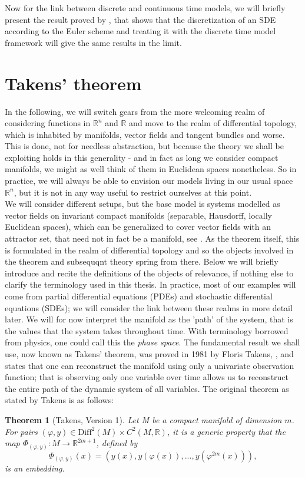 \documentclass[11pt, a4paper]{memoir}
\theoremstyle{plain}
\newtheorem{thm}{Theorem}
\theoremstyle{definition}
\newcommand{\mR}{\mathbb{R}}
\begin{document}
Now for the link between discrete and continuous time models, we will briefly present the result proved by \cite{sokol2014}, that shows that the discretization of an SDE according to the Euler scheme and treating it with the discrete time model framework will give the same results in the limit.
\section{Takens' theorem}
In the following, we will switch gears from the more welcoming realm of considering functions in $\mR^n$ and $\mR$ and move to the realm of differential topology, which is inhabited by manifolds, vector fields and tangent bundles and worse. This is done, not for needless abstraction, but because the theory we shall be exploiting holds in this generality - and in fact as long we consider compact manifolds, we might as well think of them in Euclidean spaces nonetheless. So in practice, we will always be able to envision our models living in our usual space $\mR^n$, but it is not in any way useful to restrict ourselves at this point.\\
We will consider different setups, but the base model is systems modelled as vector fields on invariant compact manifolds (separable, Hausdorff, locally Euclidean spaces), which can be generalized to cover vector fields with an attractor set, that need not in fact be a manifold, see \cite{Sauer1991}. As the theorem itself, this is formulated in the realm of differential topology and so the objects involved in the theorem and subsequqnt theory spring from there. Below we will briefly introduce and recite the definitions of the objects of relevance, if nothing else to clarify the terminology used in this thesis. In practice, most of our examples will come from partial differential equations (PDEs) and stochastic differential equations (SDEs); we will consider the link between these realms in more detail later. We will for now interpret the manifold as the 'path' of the system, that is the values that the system takes throughout time. With terminology borrowed from physics, one could call this the \textit{phase space}. The fundamental result we shall use, now known as Takens' theorem, was proved in 1981 by Floris Takens, \cite{Takens}, and states that one can reconstruct the manifold using only a univariate observation function; that is observing only one variable over time allows us to reconstruct the entire path of the dynamic system of all variables. The original theorem as stated by Takens is as follows:
\begin{thm}[Takens, Version 1]
Let M be a compact manifold of dimension $m$. For pairs $(\varphi,y)\in \text{Diff}^2(M)\times C^2(M,\mathbb{R})$, it is a generic property that the map $\Phi_{(\varphi,y)}:M\to \mathbb{R}^{2m+1}$, defined by
$$\Phi_{(\varphi,y)}(x)=(y(x),y(\varphi(x)),...,y(\varphi^{2m}(x))),$$
is an embedding. \cite{Takens}
\end{thm}
\end{document}

